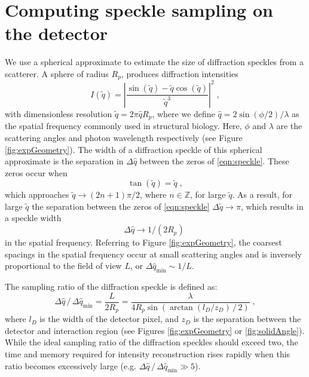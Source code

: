 \documentclass[]{iucr}              %
\begin{document}
\section{Computing speckle sampling on the detector}\label{sec:speckle}
We use a spherical approximate to estimate the size of diffraction speckles from a scatterer. A sphere of radius $R_p$, produces diffraction intensities 
\begin{equation}
I(\widetilde{q}) = \left|\frac{\sin(\widetilde{q}) - \widetilde{q} \cos(\widetilde{q})} {\widetilde{q}^3} \right|^2 \;, \label{eqn:speckle}
\end{equation}
with dimensionless resolution $\widetilde{q} = 2 \pi \widehat{q} R_p$, where we define $\widehat{q} = 2 \sin(\phi/2) / \lambda$ as the spatial frequency commonly used in structural biology. Here, $\phi$ and $\lambda$ are the scattering angles and photon wavelength respectively (see Figure \ref{fig:expGeometry}). The width of a diffraction speckle of this spherical approximate is the separation in $\Delta \widehat{q} $ between the zeros of \eqref{eqn:speckle}. These zeros occur when 
\begin{equation}
\tan(\widetilde{q}) = \widetilde{q} \;,
\end{equation}
which approaches $\widetilde{q} \to (2n+1) \pi / 2$, where $n \in \mathbb{Z}$, for large $\widetilde{q}$. As a result, for large $\widetilde{q}$ the separation between the zeros of \eqref{eqn:speckle} $\Delta \widetilde{q} \to \pi$, which results in a speckle width 
\begin{equation}
\Delta \widehat{q} \to 1/(2 R_p) \; 
\end{equation}
 in the spatial frequency. Referring to Figure \ref{fig:expGeometry}, the coarsest spacings in the spatial frequency occur at small scattering angles and is inversely proportional to the field of view $L$, or $\Delta \widehat{q}_{\text{min}} \sim 1/L$. 

The sampling ratio of the diffraction speckle is defined as:
\begin{equation}
\Delta \widehat{q} \,/\, \Delta \widehat{q}_{\text{min}} = \frac{L}{2R_p} = \frac{\lambda}{4 R_p \sin\left( \arctan (l_D / z_D) \,/\,2 \right)}\; ,
\end{equation}
where $l_D$ is the width of the detector pixel, and $z_D$ is the separation between the detector and interaction region (see Figures \ref{fig:expGeometry} or \ref{fig:solidAngle}). While the ideal sampling ratio of the diffraction speckles should exceed two, the time and memory required for intensity reconstruction rises rapidly when this ratio becomes excessively large (e.g. $ \Delta \widehat{q} \,/\, \Delta \widehat{q}_{\text{min}} \gg 5$). 
\end{document}
